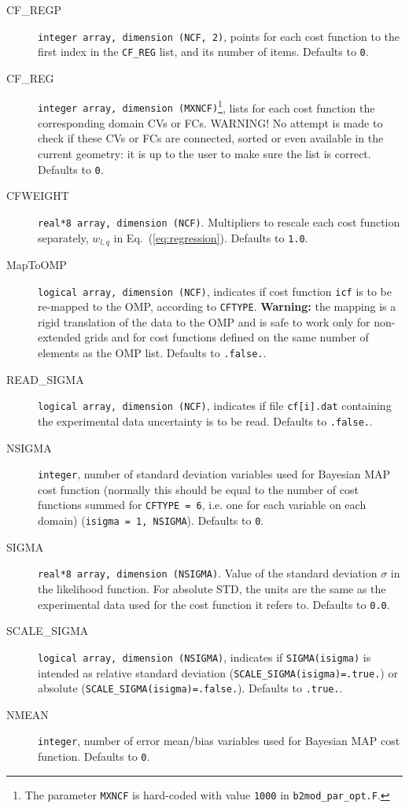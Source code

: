 \begin{description}
  \item[CF\_REGP] {\tt integer array, dimension (NCF, 2)}, points for each cost function to the first index in the {\tt CF\_REG} list, and its number of items. Defaults to {\tt 0}.
  \item[CF\_REG] {\tt integer array, dimension (MXNCF)}\footnote{The parameter {\tt MXNCF} is hard-coded with value {\tt 1000} in {\tt b2mod\_par\_opt.F}.}, lists for each cost function the corresponding domain CVs or FCs. WARNING! No attempt is made to check if these CVs or FCs are connected, sorted or even available in the current geometry: it is up to the user to make sure the list is correct. Defaults to {\tt 0}.
  \item[CFWEIGHT] {\tt real*8 array, dimension (NCF)}. Multipliers to rescale each cost function separately, $w_{l,q}$ in Eq.~(\ref{eq:regression}). Defaults to {\tt 1.0}.
  \item[MapToOMP] {\tt logical array, dimension (NCF)}, indicates if cost function {\tt icf} is to be re-mapped to the OMP, according to {\tt CFTYPE}. \textbf{Warning:} the mapping is a rigid translation of the data to the OMP and is safe to work only for non-extended grids and for cost functions defined on the same number of elements as the OMP list. Defaults to {\tt .false.}.
  \item[READ\_SIGMA] {\tt logical array, dimension (NCF)}, indicates if file {\tt cf[i].dat} containing the experimental data uncertainty is to be read. Defaults to {\tt .false.}.
  \item[NSIGMA] {\tt integer}, number of standard deviation variables used for Bayesian MAP cost function (normally this should be equal to the number of cost functions summed for {\tt CFTYPE = 6}, i.e. one for each variable on each domain) ({\tt isigma = 1, NSIGMA}). Defaults to {\tt 0}.
  \item[SIGMA] {\tt real*8 array, dimension (NSIGMA)}. Value of the standard deviation $\sigma$ in the likelihood function. For absolute STD, the units are the same as the experimental data used for the cost function it refers to. Defaults to {\tt 0.0}.
  \item[SCALE\_SIGMA] {\tt logical array, dimension (NSIGMA)}, indicates if {\tt SIGMA(isigma)} is intended as relative standard deviation ({\tt SCALE\_SIGMA(isigma)=.true.}) or absolute ({\tt SCALE\_SIGMA(isigma)=\allowbreak .false.}). Defaults to {\tt .true.}.
  \item[NMEAN] {\tt integer}, number of error mean/bias variables used for Bayesian MAP cost function. Defaults to {\tt 0}.

\end{description}
